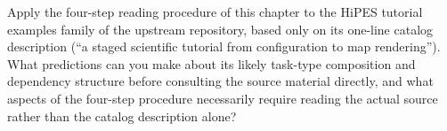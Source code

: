 \begin{exercise}
Apply the four-step reading procedure of this chapter to the HiPES tutorial
examples family of the upstream repository, based
only on its one-line catalog description (``a staged scientific tutorial
from configuration to map rendering''). What predictions can you make about
its likely task-type composition and dependency structure before consulting
the source material directly, and what aspects of the four-step procedure
necessarily require reading the actual source rather than the catalog
description alone?
\end{exercise}
